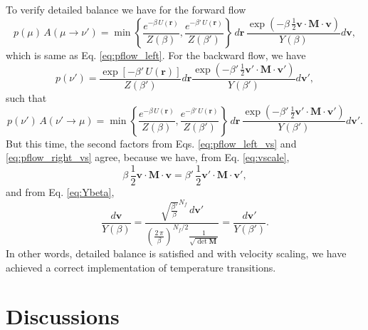 \documentclass[11pt]{article}
\begin{document}
To verify detailed balance we have for the forward flow
%
\begin{equation}
  p(\mu) \, A(\mu \to \nu')
  =
  \min\left\{
    \frac{
      e^{ -\beta \, U(\mathbf r) }
    }
    {
      Z(\beta)
    }
    ,
    \frac{
      e^{ -\beta' \, U(\mathbf r) }
    }
    {
      Z(\beta')
    }
  \right\}
  \, d \mathbf r \,
  \frac{
    \exp\left(
      -\beta \, \frac{1}{2} \mathbf v \cdot \mathbf M \cdot \mathbf v
    \right)
  }
  {
    Y(\beta)
  }
  d \mathbf v
  ,
\label{eq:pflow_left_vs}
\end{equation}
%
which is same as Eq. \eqref{eq:pflow_left}.
%
For the backward flow,
we have
$$
  p(\nu')
  =
  \frac{
    \exp\left[
       -\beta' \, U(\mathbf r)
    \right]
  }
  {
    Z(\beta')
  }
  d \mathbf r
  \frac{
    \exp\left(
      -\beta' \, \frac{1}{2} \mathbf v' \cdot \mathbf M \cdot \mathbf v'
    \right)
  }
  {
    Y(\beta')
  }
  d \mathbf v'
  ,
$$
such that
%
\begin{equation}
  p(\nu') \, A(\nu' \to \mu)
  =
  \min\left\{
    \frac{
      e^{ -\beta \, U(\mathbf r) }
    }
    {
      Z(\beta)
    }
    ,
    \frac{
      e^{ -\beta' \, U(\mathbf r) }
    }
    {
      Z(\beta')
    }
  \right\}
  \, d \mathbf r \,
  \frac{
    \exp\left(
      -\beta' \, \frac{1}{2} \mathbf v' \cdot \mathbf M \cdot \mathbf v'
    \right)
  }
  {
    Y(\beta')
  }
  d \mathbf v'
  .
\label{eq:pflow_right_vs}
\end{equation}
%
But this time,
the second factors from Eqs. \eqref{eq:pflow_left_vs}
and \eqref{eq:pflow_right_vs} agree,
because we have, from
Eq. \eqref{eq:vscale},
%
$$
  \beta \, \frac{1}{2} \mathbf v \cdot \mathbf M \cdot \mathbf v
  =
  \beta' \, \frac{1}{2} \mathbf v' \cdot \mathbf M \cdot \mathbf v'
  ,
$$
%
and from Eq. \eqref{eq:Ybeta},
%
$$
  \frac{ d \mathbf v } { Y(\beta) }
  =
  \frac{
    \sqrt { \frac { \beta' } { \beta } }^{ N_f }
    \, d \mathbf v'
  }
  {
    \left(
      \frac{ 2 \, \pi } { \beta }
    \right)^{ N_f / 2 }
    \frac{ 1 } { \sqrt { \det \mathbf M } }
  }
  =
  \frac{ d \mathbf v' } { Y(\beta') }
  .
$$
%
In other words, detailed balance is satisfied
and with velocity scaling,
we have achieved a correct implementation of temperature transitions.


\section{Discussions}
\end{document}
